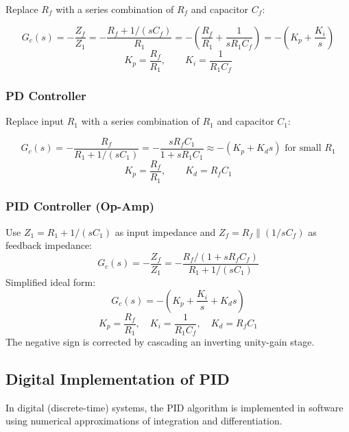 \documentclass[12pt,a4paper]{article}
\begin{document}
Replace $R_f$ with a series combination of $R_f$ and capacitor $C_f$:

\begin{tcolorbox}[formulabox, title={PI Controller — Op-Amp Transfer Function}]
$$G_c(s) = -\frac{Z_f}{Z_1} = -\frac{R_f + 1/(sC_f)}{R_1} = -\left(\frac{R_f}{R_1} + \frac{1}{sR_1C_f}\right) = -\left(K_p + \frac{K_i}{s}\right)$$
$$K_p = \frac{R_f}{R_1}, \qquad K_i = \frac{1}{R_1 C_f}$$
\end{tcolorbox}

\subsubsection*{PD Controller}

Replace input $R_1$ with a series combination of $R_1$ and capacitor $C_1$:

\begin{tcolorbox}[formulabox, title={PD Controller — Op-Amp Transfer Function}]
$$G_c(s) = -\frac{R_f}{R_1 + 1/(sC_1)} = -\frac{sR_fC_1}{1 + sR_1C_1} \approx -(K_p + K_d s) \text{ for small }R_1$$
$$K_p = \frac{R_f}{R_1}, \qquad K_d = R_f C_1$$
\end{tcolorbox}

\subsubsection*{PID Controller (Op-Amp)}

\begin{tcolorbox}[formulabox, title={PID Controller — Op-Amp Transfer Function}]
Use $Z_1 = R_1 + 1/(sC_1)$ as input impedance and $Z_f = R_f \| (1/sC_f)$ as feedback impedance:
$$G_c(s) = -\frac{Z_f}{Z_1} = -\frac{R_f/(1+sR_fC_f)}{R_1 + 1/(sC_1)}$$
Simplified ideal form:
$$G_c(s) = -\left(K_p + \frac{K_i}{s} + K_d s\right)$$
$$K_p = \frac{R_f}{R_1},\quad K_i = \frac{1}{R_1 C_f},\quad K_d = R_f C_1$$
The negative sign is corrected by cascading an inverting unity-gain stage.
\end{tcolorbox}

\subsection{Digital Implementation of PID}

In digital (discrete-time) systems, the PID algorithm is implemented in software using numerical approximations of integration and differentiation.
\end{document}
